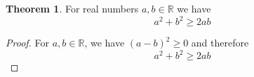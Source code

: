 \documentclass[a4paper, 12pt]{article}
\theoremstyle{definition}
\newtheorem{theorem}{Theorem}
\begin{document}
	\begin{theorem}
		For real numbers $ a,b\in\mathbb{R} $ we have 
		$$ a^2+b^2 \ge 2ab $$
	\end{theorem}
	\begin{proof}
		For $ a,b\in\mathbb{R} $, we have $ (a-b)^2 \ge 0 $ and therefore
		$$ a^2+b^2 \ge 2ab $$
	\end{proof}
\end{document}
